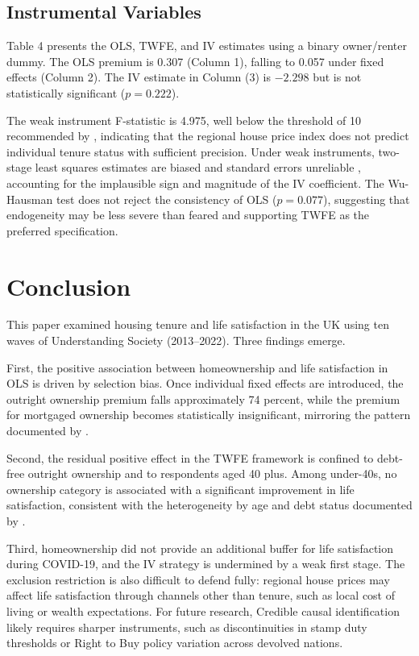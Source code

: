 \documentclass[12pt,a4paper]{article}
\begin{document}
\subsection{Instrumental Variables}
 
Table 4 presents the OLS, TWFE, and IV estimates using a binary owner/renter
dummy. The OLS premium is 0.307 (Column 1), falling to 0.057 under fixed
effects (Column 2). The IV estimate in Column (3) is $-2.298$ but is not
statistically significant ($p = 0.222$).
 
The weak instrument F-statistic is 4.975, well below the threshold of 10
recommended by \citet{Staiger1997}, indicating that the regional house price
index does not predict individual tenure status with sufficient precision.
Under weak instruments, two-stage least squares estimates are biased and
standard errors unreliable \citep{Staiger1997}, accounting for the
implausible sign and magnitude of the IV coefficient. The Wu-Hausman test
does not reject the consistency of OLS ($p = 0.077$), suggesting that endogeneity
may be less severe than feared and supporting TWFE as the preferred
specification.
 
\section{Conclusion}
 
This paper examined housing tenure and life satisfaction in the UK using ten waves of Understanding Society (2013--2022). Three findings emerge.
 
First, the positive association between homeownership and life satisfaction in OLS is driven by selection bias. Once individual fixed effects are introduced, the outright ownership premium falls approximately 74 percent, while the premium for mortgaged ownership becomes statistically insignificant, mirroring the pattern documented by \citet{Will2024}.
 
Second, the residual positive effect in the TWFE framework is confined to debt-free outright ownership and to respondents aged 40 plus. Among under-40s, no ownership category is associated with a significant improvement in life satisfaction, consistent with the heterogeneity by age and debt status documented by \citet{ViforJ2024}.
 
Third, homeownership did not provide an additional buffer for life satisfaction during COVID-19, and the IV strategy is undermined by a weak first stage. The exclusion restriction is also difficult to defend fully: regional house prices may affect life satisfaction through channels other than tenure, such as local cost of living or wealth expectations. For future research, Credible causal identification likely requires sharper instruments, such as discontinuities in stamp duty thresholds or Right to Buy policy variation across devolved nations.
 
\end{document}
